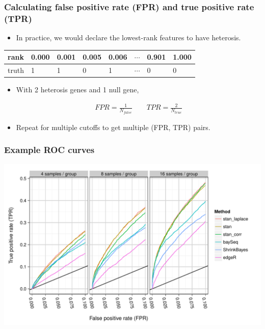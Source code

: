 \documentclass[handout]{beamer}
\numberwithin{equation}{section}
\begin{document}
\begin{frame}
\frametitle{Calculating false positive rate (FPR) and true positive rate (TPR)}

\begin{itemize}
\pause \item In practice, we would declare the lowest-rank features to have heterosis.
\end{itemize}

\pause \begin{tabular}{l|l|l|l|l|l|l|l}
rank & {\color{blue} 0.000} & {\color{blue}0.001} & {\color{blue}0.005} & 0.006 & $\cdots$ & 0.901 & 1.000  \\ \hline
truth & {\color{blue}1} & {\color{blue}1} & {\color{blue}0} & 1 & $\cdots$ & 0 & 0
\end{tabular}

\begin{itemize}
\pause \item With 2 heterosis genes and 1 null gene,

\begin{align*}
FPR = \frac{1}{N_{false}} \qquad TPR = \frac{2}{N_{true}}
\end{align*}

\pause \item Repeat for multiple cutoffs to get multiple (FPR, TPR) pairs.
\end{itemize}
\end{frame}


\begin{frame}
\frametitle{Example ROC curves}
\begin{center}
\includegraphics[scale=0.5]{roc}
\end{center}
\end{frame}
\end{document}
